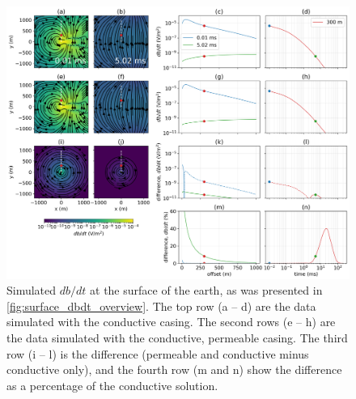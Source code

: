 \begin{figure}
    \begin{center}
    \includegraphics[width=\textwidth]{figures/em_casing/surface_dbdt_permeable.png}
    \end{center}
\caption{
    Simulated $db/dt$ at the surface of the earth, as was presented in \ref{fig:surface_dbdt_overview}.
    The top row (a -- d) are the data simulated with the conductive casing. The second rows (e -- h) are the data
    simulated with the conductive, permeable casing. The third row (i -- l) is the difference (permeable and conductive minus conductive only),
    and the fourth row (m and n) show the difference as a percentage of the conductive solution.
}
\label{fig:surface_dbdt_permeable}
\end{figure}



